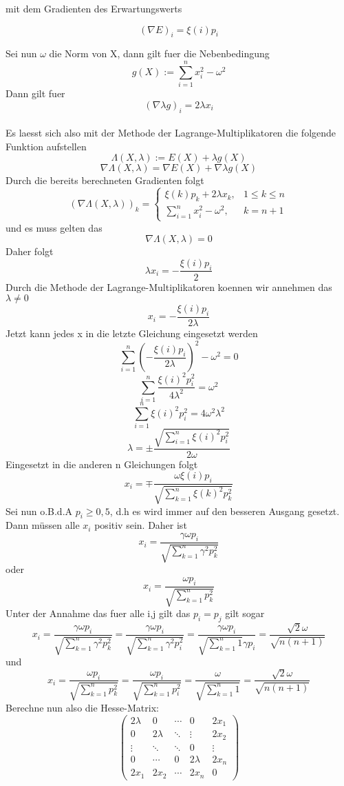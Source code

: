 \documentclass[11pt]{scrartcl}
\begin{document}
			mit dem Gradienten des Erwartungswerts
			\begin{center}
				\[(\nabla E)_{i}=\xi(i)p_{i}\]
			\end{center}
			Sei nun \(\omega\) die Norm von X, dann gilt fuer die Nebenbedingung
			\[g(X):=\sum_{i=1}^{n}x_{i}^2-{\omega}^2\]
			Dann gilt fuer \[(\nabla \lambda g)_{i} = 2\lambda x_{i}\]\\
			Es laesst sich also mit der Methode der Lagrange-Multiplikatoren die folgende Funktion aufstellen \[\Lambda(X,\lambda) := E(X)+\lambda g(X)\]
			\[\nabla \Lambda(X,\lambda) = \nabla E(X) + \nabla \lambda g(X)\]
			Durch die bereits berechneten Gradienten folgt
			\[(\nabla \Lambda (X,\lambda))_{k}=
				\begin{cases}
					\xi (k)p_{k}+2\lambda x_{k}, & 1\leq k\leq n\\
					\sum_{i=1}^{n}x_{i}^2-\omega^2, & k = n+1
				\end{cases}\]
			und es muss gelten das
			\[\nabla \Lambda(X,\lambda)=0\]
			Daher folgt
			\[\lambda x_{i} = -\frac{\xi(i)p_{i}}{2}\]
			Durch die Methode der Lagrange-Multiplikatoren koennen wir annehmen das \(\lambda \neq 0\)
			\[x_{i}= -\frac{\xi(i)p_{i}}{2\lambda}\]
			Jetzt kann jedes x in die letzte Gleichung eingesetzt werden
			\[\sum_{i=1}^{n}(-\frac{\xi(i)p_{i}}{2\lambda})^2-\omega^2=0\]
			\[\sum_{i=1}^{n}\frac{\xi(i)^2p_{i}^2}{4\lambda^2}=\omega^2\]
			\[\sum_{i=1}^{n}\xi(i)^2p_{i}^2=4\omega^2\lambda^2\]
			\[\lambda = \pm\frac{\sqrt{\sum_{i=1}^{n}\xi(i)^2p_{i}^2}}{2\omega}\]
			Eingesetzt in die anderen n Gleichungen folgt
			\[x_{i}=\mp\frac{\omega\xi(i)p_{i}}{\sqrt{\sum_{k=1}^{n}\xi(k)^2p_{k}^2}}\]
			Sei nun o.B.d.A \(p_{i}\geq0,5\), d.h es wird immer auf den besseren Ausgang gesetzt. Dann müssen alle \(x_{i}\) positiv sein. Daher ist
			$$
			x_{i}=\frac{\gamma\omega p_{i}}{\sqrt{\sum_{k=1}^{n}\gamma^2p_{k}^2}}
			$$
			oder
			$$
			x_{i}=\frac{\omega p_{i}}{\sqrt{\sum_{k=1}^{n}p_{k}^2}}
			$$
			Unter der Annahme das fuer alle i,j gilt das \(p_{i}=p_{j}\) gilt sogar
			$$
			x_{i}=\frac{\gamma\omega p_{i}}{\sqrt{\sum_{k=1}^{n}\gamma^2p_{k}^2}}=\frac{\gamma\omega p_{i}}{\sqrt{\sum_{k=1}^{n}\gamma^2p_{i}^2}}=\frac{\gamma\omega p_{i}}{\sqrt{\sum_{k=1}^{n}1}\gamma p_{i}}=\frac{\sqrt{2}\omega}{\sqrt{n(n+1)}}
			$$
			und
			$$
			x_{i}=\frac{\omega p_{i}}{\sqrt{\sum_{k=1}^{n}p_{k}^2}}=\frac{\omega p_{i}}{\sqrt{\sum_{k=1}^{n}p_{i}^2}}=\frac{\omega }{\sqrt{\sum_{k=1}^{n}1}}=\frac{\sqrt{2}\omega}{\sqrt{n(n+1)}}
			$$
			Berechne nun also die Hesse-Matrix:
			$$
			\left(
			\begin{array}{ccccc}
				2\lambda & 0 & \cdots & 0 & 2x_{1} \\
				0 & 2\lambda & \ddots & \vdots & 2x_{2} \\
				\vdots & \ddots & \ddots & 0 & \vdots \\
				0 & \cdots & 0 & 2\lambda & 2x_{n} \\
				2x_{1} & 2x_{2} & \cdots & 2x_{n} & 0
			\end{array}
			\right)
			$$
\end{document}
